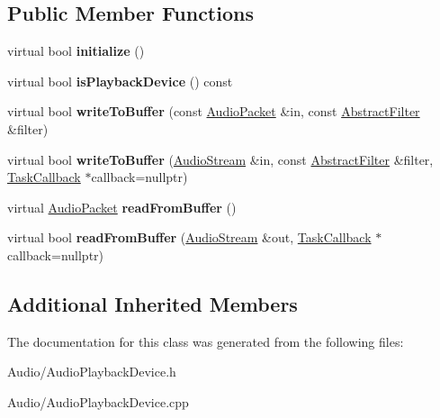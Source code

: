 \subsection*{Public Member Functions}
\begin{DoxyCompactItemize}
\item 
\hypertarget{class_d_x_1_1_audio_1_1_audio_playback_device_aff876fcea4d589dd86c7189ddd270194}{virtual bool {\bfseries initialize} ()}\label{class_d_x_1_1_audio_1_1_audio_playback_device_aff876fcea4d589dd86c7189ddd270194}

\item 
\hypertarget{class_d_x_1_1_audio_1_1_audio_playback_device_af0fff74a1fa812045492a5971e21312d}{virtual bool {\bfseries is\-Playback\-Device} () const }\label{class_d_x_1_1_audio_1_1_audio_playback_device_af0fff74a1fa812045492a5971e21312d}

\item 
\hypertarget{class_d_x_1_1_audio_1_1_audio_playback_device_a70f4d9d97b78469ca0126635083acd1d}{virtual bool {\bfseries write\-To\-Buffer} (const \hyperlink{class_d_x_1_1_audio_1_1_audio_packet}{Audio\-Packet} \&in, const \hyperlink{struct_d_x_1_1_audio_1_1_abstract_filter}{Abstract\-Filter} \&filter)}\label{class_d_x_1_1_audio_1_1_audio_playback_device_a70f4d9d97b78469ca0126635083acd1d}

\item 
\hypertarget{class_d_x_1_1_audio_1_1_audio_playback_device_a53948a11de39e9e212038a9d9722e13a}{virtual bool {\bfseries write\-To\-Buffer} (\hyperlink{class_d_x_1_1_lock_free_1_1_concurrent_stream}{Audio\-Stream} \&in, const \hyperlink{struct_d_x_1_1_audio_1_1_abstract_filter}{Abstract\-Filter} \&filter, \hyperlink{class_d_x_1_1_audio_1_1_task_callback}{Task\-Callback} $\ast$callback=nullptr)}\label{class_d_x_1_1_audio_1_1_audio_playback_device_a53948a11de39e9e212038a9d9722e13a}

\item 
\hypertarget{class_d_x_1_1_audio_1_1_audio_playback_device_a58a266b68ccadceeb2e4a05ad2292973}{virtual \hyperlink{class_d_x_1_1_audio_1_1_audio_packet}{Audio\-Packet} {\bfseries read\-From\-Buffer} ()}\label{class_d_x_1_1_audio_1_1_audio_playback_device_a58a266b68ccadceeb2e4a05ad2292973}

\item 
\hypertarget{class_d_x_1_1_audio_1_1_audio_playback_device_a0279d91d609be8ae73d792712554dc16}{virtual bool {\bfseries read\-From\-Buffer} (\hyperlink{class_d_x_1_1_lock_free_1_1_concurrent_stream}{Audio\-Stream} \&out, \hyperlink{class_d_x_1_1_audio_1_1_task_callback}{Task\-Callback} $\ast$callback=nullptr)}\label{class_d_x_1_1_audio_1_1_audio_playback_device_a0279d91d609be8ae73d792712554dc16}

\end{DoxyCompactItemize}
\subsection*{Additional Inherited Members}


The documentation for this class was generated from the following files\-:\begin{DoxyCompactItemize}
\item 
Audio/Audio\-Playback\-Device.\-h\item 
Audio/Audio\-Playback\-Device.\-cpp\end{DoxyCompactItemize}
